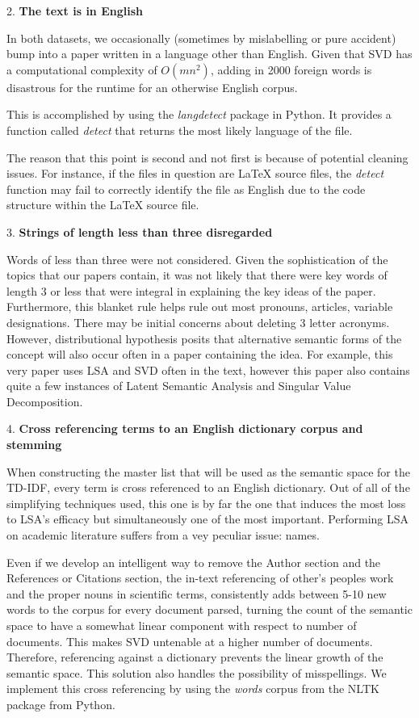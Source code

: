 \documentclass [12pt]{article}
\begin{document}
2. \textbf{The text is in English} 

In both datasets, we occasionally (sometimes by mislabelling or pure accident) bump into a paper written in a language other than English. Given that SVD has a computational complexity of $O(mn^2)$, adding in 2000 foreign words is disastrous for the runtime for an otherwise English corpus. 

This is accomplished by using the \emph{langdetect} package in Python. It provides a function called \emph{detect} that returns the most likely language of the file. 

The reason that this point is second and not first is because of potential cleaning issues. For instance, if the files in question are LaTeX source files, the \emph{detect} function may fail to correctly identify the file as English due to the code structure within the LaTeX source file. 

3. \textbf{Strings of length less than three disregarded} 

Words of less than three were not considered. Given the sophistication of the topics that our papers contain, it was not likely that there were key words of length 3 or less that were integral in explaining the key ideas of the paper. Furthermore, this blanket rule helps rule out most pronouns, articles, variable designations. There may be initial concerns about deleting 3 letter acronyms. However, distributional hypothesis posits that alternative semantic forms of the concept will also occur often in a paper containing the idea. For example, this very paper uses LSA and SVD often in the text, however this paper also contains quite a few instances of Latent Semantic Analysis and Singular Value Decomposition. 

4. \textbf{Cross referencing terms to an English dictionary corpus and stemming} 

When constructing the master list that will be used as the semantic space for the TD-IDF, every term is cross referenced to an English dictionary. Out of all of the simplifying techniques used, this one is by far the one that induces the most loss to LSA's efficacy but simultaneously one of the most important. Performing LSA on academic literature suffers from a vey peculiar issue: names. 

Even if we develop an intelligent way to remove the Author section and the References or Citations section, the in-text referencing of other's peoples work and the proper nouns in scientific terms, consistently adds between 5-10 new words to the corpus for every document parsed, turning the count of the semantic space to have a somewhat linear component with respect to number of documents. This makes SVD untenable at a higher number of documents. Therefore, referencing against a dictionary prevents the linear growth of the semantic space. This solution also handles the possibility of misspellings. We implement this cross referencing by using the \emph{words} corpus from the NLTK package from Python. 
\end{document}
